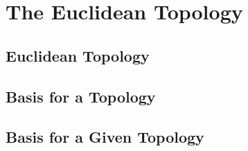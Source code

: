 \chapter{The Euclidean Topology}

\section{Euclidean Topology}



\section{Basis for a Topology}



\section{Basis for a Given Topology}



